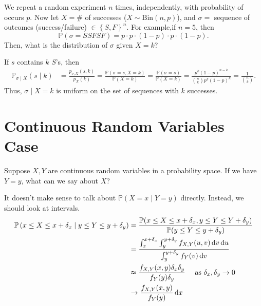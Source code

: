 \begin{eg}
    We repeat a random experiment \(n\) times, independently, with probability of occurs \(p\). Now let \(X = \#\) of successes (\(X \sim \mathrm{Bin}(n, p) \)), and \(\sigma =\) sequence of outcomes (success/failure) \( \in \left\{ S, F \right\}^n \). For example,if \(n = 5\), then  
    \[
        \mathbb{P} (\sigma = SSFSF) = p \cdot p \cdot (1 - p) \cdot p \cdot (1 - p).
    \]      
    Then, what is the distribution of \(\sigma\) given \(X = k\)?  
\end{eg}

\begin{explanation}
    If \(s\) contains \(k\) \(S\)'s, then    
    \begin{align*}
        \mathbb{P} _{\sigma \mid X}(s \mid k) &= \frac{p_{\sigma , X}(s, k)}{p_X(k)} = \frac{\mathbb{P} (\sigma = s, X = k)}{\mathbb{P} (X = k)} = \frac{\mathbb{P} (\sigma = s)}{\mathbb{P} (X = k)} = \frac{p^k (1 - p)^{n - k}}{\binom{n}{k} p^k (1 - p)^k} = \frac{1}{\binom{n}{k}}.
    \end{align*}
    Thus, \(\sigma \mid X = k\) is uniform on the set of sequences with \(k\) successes.  
\end{explanation}

\section{Continuous Random Variables Case}
Suppose \(X, Y\) are continuous random variables in a probability space. If we have \(Y = y\), what can we say about \(X\)?

It doesn't make sense to talk about \(\mathbb{P} (X = x \mid Y = y)\) directly. Instead, we should look at intervals. 
\begin{align*}
    \mathbb{P} \left( x \le X \le x + \delta _x \mid y \le Y \le y + \delta _y \right) &= \frac{\mathbb{P} (x \le X \le x + \delta _x, y \le Y \le Y + \delta _y)}{\mathbb{P} (y \le Y \le y + \delta _y)} \\
    &= \frac{\int _x^{x + \delta _x} \int _y^{y + \delta _y} f_{X, Y}(u, v) \, \mathrm{d} v \, \mathrm{d} u  }{\int _y^{y + \delta _y} f_Y(v) \, \mathrm{d} v } \\
    &\thickapprox \frac{f_{X, Y}(x,y) \delta _x \delta _y}{f_Y(y) \delta _y} \quad \text{ as } \delta _x, \delta _y \to 0  \\
    &\to \frac{f_{X, Y}(x, y)}{f_Y(y)} \, \mathrm{d} x  
\end{align*} 

